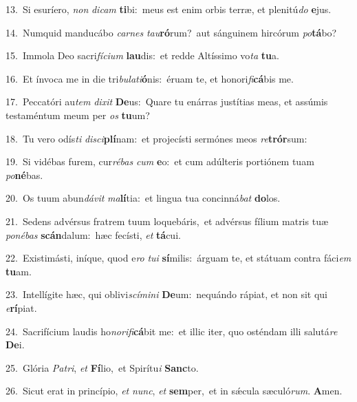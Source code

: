 {\numbfont\textcolor{\numbcolor}{13.}}~Si esuríero, \textit{non} \textit{di}\-\textit{cam} \textbf{ti}\-bi:~\star meus est enim orbis terræ, et plenitú\textit{do} \textbf{e}\-jus.\par
{\numbfont\textcolor{\numbcolor}{14.}}~Numquid manducábo \textit{car}\-\textit{nes} \textit{tau}\-\textbf{ró}rum?~\star aut sánguinem hircórum \textit{po}\-\textbf{tá}bo?\par
{\numbfont\textcolor{\numbcolor}{15.}}~Immola Deo sacri\-\textit{fí}\-\textit{ci}\textit{um} \textbf{lau}\-dis:~\star et redde Altíssimo vo\textit{ta} \textbf{tu}\-a.\par
{\numbfont\textcolor{\numbcolor}{16.}}~Et ínvoca me in die tri\-\textit{bu}\-\textit{la}\textit{ti}\textbf{ó}nis:~\star éruam te, et honori\-\textit{fi}\-\textbf{cá}bis me.\par
{\numbfont\textcolor{\numbcolor}{17.}}~Peccatóri au\textit{tem} \textit{di}\-\textit{xit} \textbf{De}\-us:~\star Quare tu enárras justítias meas, et assúmis testaméntum meum per \textit{os} \textbf{tu}\-um?\par
{\numbfont\textcolor{\numbcolor}{18.}}~Tu vero odís\textit{ti} \textit{di}\-\textit{sci}\textbf{plí}nam:~\star et projecísti sermónes meos \textit{re}\-\textbf{trór}sum:\par
{\numbfont\textcolor{\numbcolor}{19.}}~Si vidébas furem, cur\-\textit{ré}\-\textit{bas} \textit{cum} \textbf{e}\-o:~\star et cum adúlteris portiónem tuam \textit{po}\-\textbf{né}bas.\par
{\numbfont\textcolor{\numbcolor}{20.}}~Os tuum abun\-\textit{dá}\-\textit{vit} \textit{ma}\-\textbf{lí}tia:~\star et lingua tua concinná\textit{bat} \textbf{do}\-los.\par
{\numbfont\textcolor{\numbcolor}{21.}}~Sedens advérsus fratrem tuum loquebáris,~\dagger et advérsus fílium matris tuæ \textit{po}\-\textit{né}\textit{bas} \textbf{scán}\-dalum:~\star hæc fecísti, \textit{et} \textbf{tá}\-cui.\par
{\numbfont\textcolor{\numbcolor}{22.}}~Existimásti, iníque, quod e\textit{ro} \textit{tu}\-\textit{i} \textbf{sí}\-milis:~\star árguam te, et státuam contra fáci\textit{em} \textbf{tu}\-am.\par
{\numbfont\textcolor{\numbcolor}{23.}}~Intellígite hæc, qui oblivi\-\textit{scí}\-\textit{mi}\textit{ni} \textbf{De}\-um:~\star nequándo rápiat, et non sit qui \textit{e}\-\textbf{rí}piat.\par
{\numbfont\textcolor{\numbcolor}{24.}}~Sacrifícium laudis ho\-\textit{no}\-\textit{ri}\textit{fi}\textbf{cá}bit me:~\star et illic iter, quo osténdam illi salutá\textit{re} \textbf{De}\-i.\par
{\numbfont\textcolor{\numbcolor}{25.}}~Glória \textit{Pa}\-\textit{tri}, \textit{et} \textbf{Fí}\-lio,~\star et Spirítu\textit{i} \textbf{Sanc}\-to.\par
{\numbfont\textcolor{\numbcolor}{26.}}~Sicut erat in princípio, \textit{et} \textit{nunc}\-, \textit{et} \textbf{sem}\-per,~\star et in sǽcula sæculó\-\textit{rum}\-. \textbf{A}\-men.\par
